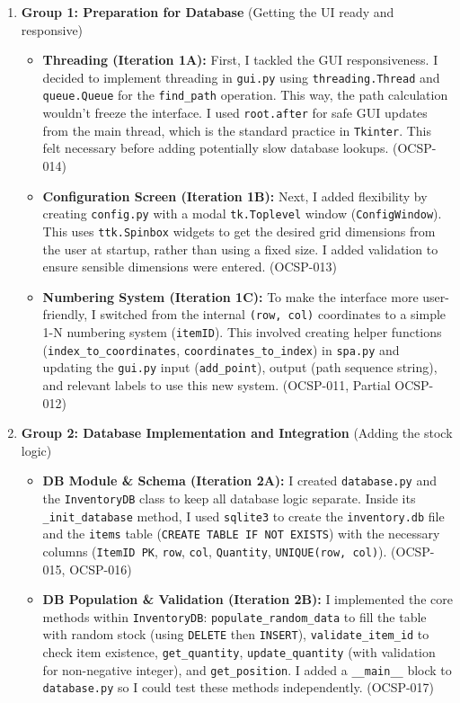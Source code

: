 \begin{enumerate}
	\item \textbf{Group 1: Preparation for Database} (Getting the UI ready and responsive)
	\begin{itemize}
		\item \textbf{Threading (Iteration 1A):} First, I tackled the GUI responsiveness. I decided to implement threading in \verb|gui.py| using \verb|threading.Thread| and \verb|queue.Queue| for the \verb|find_path| operation. This way, the path calculation wouldn't freeze the interface. I used \verb|root.after| for safe GUI updates from the main thread, which is the standard practice in \verb|Tkinter|. This felt necessary before adding potentially slow database lookups. (OCSP-014)
		\item \textbf{Configuration Screen (Iteration 1B):} Next, I added flexibility by creating \verb|config.py| with a modal \verb|tk.Toplevel| window (\verb|ConfigWindow|). This uses \verb|ttk.Spinbox| widgets to get the desired grid dimensions from the user at startup, rather than using a fixed size. I added validation to ensure sensible dimensions were entered. (OCSP-013)
		\item \textbf{Numbering System (Iteration 1C):} To make the interface more user-friendly, I switched from the internal \verb|(row, col)| coordinates to a simple 1-N numbering system (\verb|itemID|). This involved creating helper functions (\verb|index_to_coordinates|, \verb|coordinates_to_index|) in \verb|spa.py| and updating the \verb|gui.py| input (\verb|add_point|), output (path sequence string), and relevant labels to use this new system. (OCSP-011, Partial OCSP-012)
	\end{itemize}
	\item \textbf{Group 2: Database Implementation and Integration} (Adding the stock logic)
	\begin{itemize}
		\item \textbf{DB Module \& Schema (Iteration 2A):} I created \verb|database.py| and the \verb|InventoryDB| class to keep all database logic separate. Inside its \verb|_init_database| method, I used \verb|sqlite3| to create the \verb|inventory.db| file and the \verb|items| table (\verb|CREATE TABLE IF NOT EXISTS|) with the necessary columns (\verb|ItemID PK|, \verb|row|, \verb|col|, \verb|Quantity|, \verb|UNIQUE(row, col)|). (OCSP-015, OCSP-016)
		\item \textbf{DB Population \& Validation (Iteration 2B):} I implemented the core methods within \verb|InventoryDB|: \verb|populate_random_data| to fill the table with random stock (using \verb|DELETE| then \verb|INSERT|), \verb|validate_item_id| to check item existence, \verb|get_quantity|, \verb|update_quantity| (with validation for non-negative integer), and \verb|get_position|. I added a \verb|__main__| block to \verb|database.py| so I could test these methods independently. (OCSP-017)

\end{itemize}
\end{enumerate}
